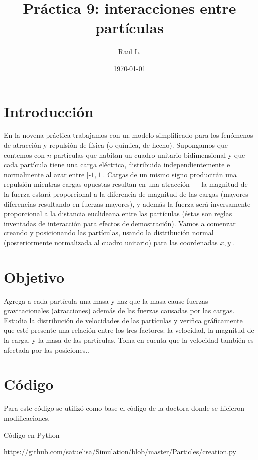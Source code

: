 \documentclass{article}
\author{Raul L.} %
\title{Pr\'{a}ctica 9: interacciones entre partículas} %
\date{\today}
\begin{document}

\maketitle %


\section{Introducci\'{o}n}\label{intro} %
En la novena práctica trabajamos con un modelo simplificado para los fenómenos de atracción y repulsión de física (o química, de hecho). Supongamos que contemos con $n$ partículas que habitan un cuadro unitario bidimensional y que cada partícula tiene una carga eléctrica, distribuida independientemente e normalmente al azar entre $[$-$1,1]$. Cargas de un mismo signo producirán una repulsión mientras cargas opuestas resultan en una atracción — la magnitud de la fuerza estará proporcional a la diferencia de magnitud de las cargas (mayores diferencias resultando en fuerzas mayores), y además la fuerza será inversamente proporcional a la distancia euclideana entre las partículas (éstas son reglas inventadas de interacción para efectos de demostración). Vamos a comenzar creando y posicionando las partículas, usando la distribución normal (posteriormente normalizada al cuadro unitario) para las coordenadas $x, y $ \citep{2}.


\section{Objetivo}
Agrega a cada partícula una masa y haz que la masa cause fuerzas gravitacionales (atracciones) además de las fuerzas causadas por las cargas. Estudia la distribución de velocidades de las partículas y verifica gráficamente que esté presente una relación entre los tres factores: la velocidad, la magnitud de la carga, y la masa de las partículas. Toma en cuenta que la velocidad también es afectada por las posiciones.\citep{2}.

\section{C\'{o}digo}
Para este código se utilizó como base el código de la doctora donde se hicieron modificaciones.

 Código en Python 

\url{https://github.com/satuelisa/Simulation/blob/master/Particles/creation.py}
\end{document}
